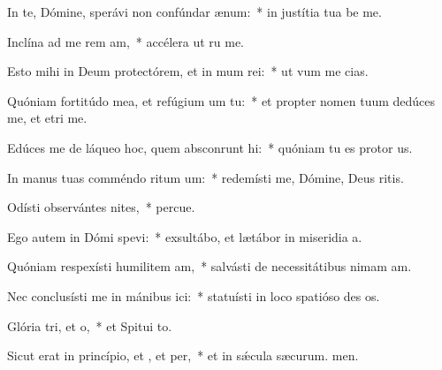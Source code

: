 \item In te, Dómine, sperávi non confúndar  ænum:~* in justítia tua be me.
\item Inclína ad me rem am,~* accélera ut ru me.
\item Esto mihi in Deum protectórem, et in mum rei:~* ut vum me cias.
\item Quóniam fortitúdo mea, et refúgium um  tu:~* et propter nomen tuum dedúces me, et etri me.
\item Edúces me de láqueo hoc, quem absconrunt hi:~* quóniam tu es protor us.
\item In manus tuas comméndo ritum um:~* redemísti me, Dómine, Deus ritis.
\item Odísti observántes nites,~* percue.
\item Ego autem in Dómi spevi:~* exsultábo, et lætábor in miseridia a.
\item Quóniam respexísti humilitem am,~* salvásti de necessitátibus nimam am.
\item Nec conclusísti me in mánibus ici:~* statuísti in loco spatióso des os.
\item Glória tri, et o,~* et Spitui to.
\item Sicut erat in princípio, et , et per,~* et in sǽcula sæcurum. men.
